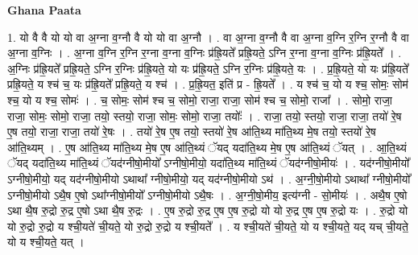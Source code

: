 \documentclass[17pt]{extarticle}
\begin{document}
\textbf{Ghana Paata } \newline

1. यो वै वै यो यो वा अ॒ग्ना व॒ग्नौ वै यो यो वा अ॒ग्नौ । . वा अ॒ग्ना व॒ग्नौ वै वा अ॒ग्ना व॒ग्नि र॒ग्नि र॒ग्नौ वै वा अ॒ग्ना व॒ग्निः । . अ॒ग्ना व॒ग्नि र॒ग्नि र॒ग्ना व॒ग्ना व॒ग्निः प्र॑ह्रि॒यते᳚ प्रह्रि॒यते॒ ऽग्नि र॒ग्ना व॒ग्ना व॒ग्निः प्र॑ह्रि॒यते᳚ । . अ॒ग्निः प्र॑ह्रि॒यते᳚ प्रह्रि॒यते॒ ऽग्नि र॒ग्निः प्र॑ह्रि॒यते॒ यो यः प्र॑ह्रि॒यते॒ ऽग्नि र॒ग्निः प्र॑ह्रि॒यते॒ यः । . प्र॒ह्रि॒यते॒ यो यः प्र॑ह्रि॒यते᳚ प्रह्रि॒यते॒ य श्च॑ च॒ यः प्र॑ह्रि॒यते᳚ प्रह्रि॒यते॒ य श्च॑ । . प्र॒ह्रि॒यत॒ इति॑ प्र - ह्रि॒यते᳚ । . य श्च॑ च॒ यो य श्च॒ सोमः॒ सोम॑ श्च॒ यो य श्च॒ सोमः॑ । . च॒ सोमः॒ सोम॑ श्च च॒ सोमो॒ राजा॒ राजा॒ सोम॑ श्च च॒ सोमो॒ राजा᳚ । . सोमो॒ राजा॒ राजा॒ सोमः॒ सोमो॒ राजा॒ तयो॒ स्तयो॒ राजा॒ सोमः॒ सोमो॒ राजा॒ तयोः᳚ । . राजा॒ तयो॒ स्तयो॒ राजा॒ राजा॒ तयो॑ रे॒ष ए॒ष तयो॒ राजा॒ राजा॒ तयो॑ रे॒षः । . तयो॑ रे॒ष ए॒ष तयो॒ स्तयो॑ रे॒ष आ॑ति॒थ्य मा॑ति॒थ्य मे॒ष तयो॒ स्तयो॑ रे॒ष आ॑ति॒थ्यम् । . ए॒ष आ॑ति॒थ्य मा॑ति॒थ्य मे॒ष ए॒ष आ॑ति॒थ्यं ॅयद् यदा॑ति॒थ्य मे॒ष ए॒ष आ॑ति॒थ्यं ॅयत् । . आ॒ति॒थ्यं ॅयद् यदा॑ति॒थ्य मा॑ति॒थ्यं ॅयद॑ग्नीषो॒मीयो᳚ ऽग्नीषो॒मीयो॒ यदा॑ति॒थ्य मा॑ति॒थ्यं ॅयद॑ग्नीषो॒मीयः॑ । . यद॑ग्नीषो॒मीयो᳚ ऽग्नीषो॒मीयो॒ यद् यद॑ग्नीषो॒मीयो ऽथाथा᳚ ग्नीषो॒मीयो॒ यद् यद॑ग्नीषो॒मीयो ऽथ॑ । . अ॒ग्नी॒षो॒मीयो ऽथाथा᳚ ग्नीषो॒मीयो᳚ ऽग्नीषो॒मीयो ऽथै॒ष ए॒षो ऽथा᳚ग्नीषो॒मीयो᳚ ऽग्नीषो॒मीयो ऽथै॒षः । . अ॒ग्नी॒षो॒मीय॒ इत्य॑ग्नी - सो॒मीयः॑ । . अथै॒ष ए॒षो ऽथा थै॒ष रु॒द्रो रु॒द्र ए॒षो ऽथा थै॒ष रु॒द्रः । . ए॒ष रु॒द्रो रु॒द्र ए॒ष ए॒ष रु॒द्रो यो यो रु॒द्र ए॒ष ए॒ष रु॒द्रो यः । . रु॒द्रो यो यो रु॒द्रो रु॒द्रो य श्ची॒यते॑ ची॒यते॒ यो रु॒द्रो रु॒द्रो य श्ची॒यते᳚ । . य श्ची॒यते॑ ची॒यते॒ यो य श्ची॒यते॒ यद् यच् ची॒यते॒ यो य श्ची॒यते॒ यत् । \newline
\end{document}
